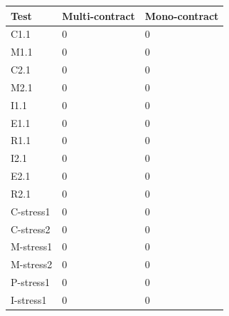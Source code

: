 \documentclass{article}
\begin{document}
		\begin{tabular}{| l | l | l |}
			\hline
			Test & Multi-contract & Mono-contract \\ \hline
			C1.1 & 0 & 0 \\ \hline
			M1.1 & 0 & 0 \\ \hline
			C2.1 & 0 & 0 \\ \hline
			M2.1 & 0 & 0 \\ \hline
			I1.1 & 0 & 0 \\ \hline
			E1.1 & 0 & 0 \\ \hline
			R1.1 & 0 & 0 \\ \hline
			I2.1 & 0 & 0 \\ \hline
			E2.1 & 0 & 0 \\ \hline
			R2.1 & 0 & 0 \\ \hline
			C-stress1 & 0 & 0 \\ \hline
			C-stress2 & 0 & 0 \\ \hline
			M-stress1 & 0 & 0 \\ \hline
			M-stress2 & 0 & 0 \\ \hline
			P-stress1 & 0 & 0 \\ \hline
			I-stress1 & 0 & 0 \\
			\hline
		\end{tabular}
\end{document}
